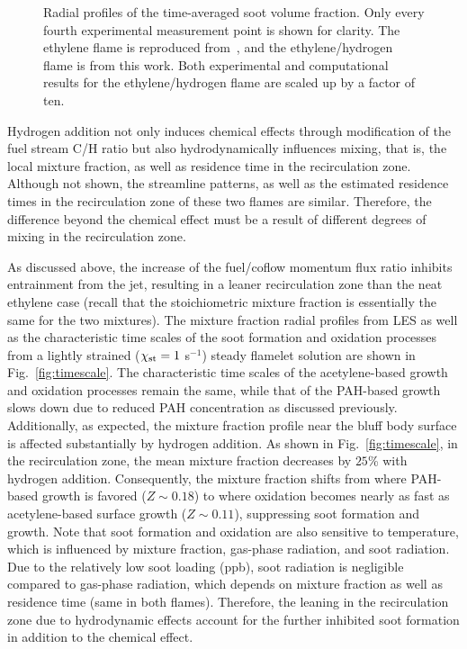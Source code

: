 \documentclass{essci}
\begin{document}
\begin{figure}[t]
  \centering
  \scriptsize
  \vspace{-0.20in}
  \resizebox{0.49\textwidth}{!}{}
  \resizebox{0.49\textwidth}{!}{}
  \vspace{-0.2in}
  \normalsize
  \caption{Radial profiles of the time-averaged soot volume fraction.  Only every fourth experimental measurement point is shown for clarity.  The ethylene flame is reproduced from~\cite{mueller13}, and the ethylene/hydrogen flame is from this work.  Both experimental and computational results for the ethylene/hydrogen flame are scaled up by a factor of ten.}
  \label{fig:fv_radial}
\end{figure}

Hydrogen addition not only induces chemical effects through modification of the fuel stream C/H ratio but also hydrodynamically influences mixing, that is, the local mixture fraction, as well as residence time in the recirculation zone.  Although not shown, the streamline patterns, as well as the estimated residence times in the recirculation zone of these two flames are similar.  Therefore, the difference beyond the chemical effect must be a result of different degrees of mixing in the recirculation zone.

As discussed above, the increase of the fuel/coflow momentum flux ratio inhibits entrainment from the jet, resulting in a leaner recirculation zone than the neat ethylene case (recall that the stoichiometric mixture fraction is essentially the same for the two mixtures).  The mixture fraction radial profiles from LES as well as the characteristic time scales of the soot formation and oxidation processes from a lightly strained ($\chi_{\rm st} = 1$ s$^{-1}$) steady flamelet solution are shown in Fig.~\ref{fig:timescale}.  The characteristic time scales of the acetylene-based growth and oxidation processes remain the same, while that of the PAH-based growth slows down due to reduced PAH concentration as discussed previously.  Additionally, as expected, the mixture fraction profile near the bluff body surface is affected substantially by hydrogen addition.  As shown in Fig.~\ref{fig:timescale}, in the recirculation zone, the mean mixture fraction decreases by $25$\% with hydrogen addition.  Consequently, the mixture fraction shifts from where PAH-based growth is favored ($Z \sim 0.18$) to where oxidation becomes nearly as fast as acetylene-based surface growth ($Z \sim 0.11$), suppressing soot formation and growth.  Note that soot formation and oxidation are also sensitive to temperature, which is influenced by mixture fraction, gas-phase radiation, and soot radiation.  Due to the relatively low soot loading (ppb), soot radiation is negligible compared to gas-phase radiation, which depends on mixture fraction as well as residence time (same in both flames).  Therefore, the leaning in the recirculation zone due to hydrodynamic effects account for the further inhibited soot formation in addition to the chemical effect.
\end{document}
